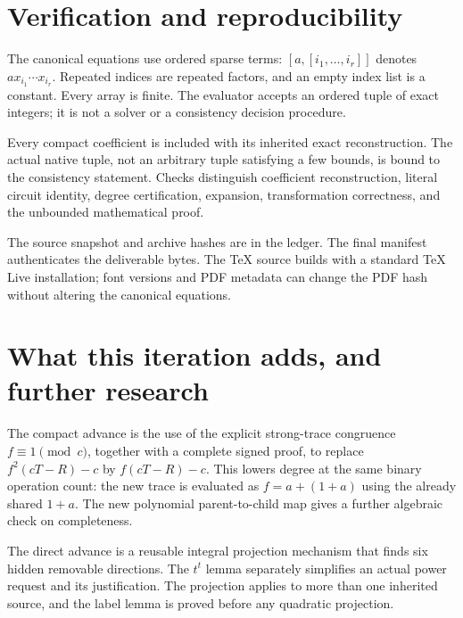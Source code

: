 \section{Verification and reproducibility}\label{sec:verification}


The canonical equations use ordered sparse terms:
$[a,[i_1,\ldots,i_r]]$ denotes $a x_{i_1}\cdots x_{i_r}$.
Repeated indices are repeated factors, and an empty index list is a
constant. Every array is finite. The evaluator accepts an ordered tuple
of exact integers; it is not a solver or a consistency decision procedure.

Every compact coefficient is included with its inherited exact
reconstruction. The actual native tuple, not an arbitrary tuple
satisfying a few bounds, is bound to the consistency statement.
Checks distinguish coefficient reconstruction, literal circuit identity,
degree certification, expansion, transformation correctness, and the
unbounded mathematical proof.

The source snapshot and archive hashes are in the ledger. The final
manifest authenticates the deliverable bytes. The TeX source builds
with a standard TeX Live installation; font versions and PDF metadata
can change the PDF hash without altering the canonical equations.

\section{What this iteration adds, and further research}

The compact advance is the use of the explicit strong-trace congruence
$f\equiv1\pmod c$, together with a complete signed proof, to replace
$f^2(cT-R)-c$ by $f(cT-R)-c$. This lowers degree at the same binary operation count: the new trace
is evaluated as $f=a+(1+a)$ using the already shared $1+a$. The new polynomial parent-to-child map gives a further
algebraic check on completeness.

The direct advance is a reusable integral projection mechanism that
finds six hidden removable directions. The $t^t$ lemma separately
simplifies an actual power request and its justification. The projection
applies to more than one inherited source, and the label lemma is
proved before any quadratic projection.


